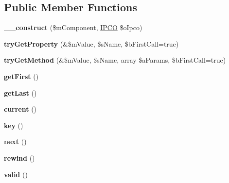 \subsection*{Public Member Functions}
\begin{DoxyCompactItemize}
\item 
\hypertarget{class_i_p_c_o___object_component_wrapper_a79d34f90ba8ddbee71a86182798eb7b3}{{\bfseries \-\_\-\-\_\-construct} (\$m\-Component, \hyperlink{class_i_p_c_o}{I\-P\-C\-O} \$o\-Ipco)}\label{class_i_p_c_o___object_component_wrapper_a79d34f90ba8ddbee71a86182798eb7b3}

\item 
\hypertarget{class_i_p_c_o___object_component_wrapper_aec8fb2d41cca130ebd1faa4b94f58161}{{\bfseries try\-Get\-Property} (\&\$m\-Value, \$s\-Name, \$b\-First\-Call=true)}\label{class_i_p_c_o___object_component_wrapper_aec8fb2d41cca130ebd1faa4b94f58161}

\item 
\hypertarget{class_i_p_c_o___object_component_wrapper_ac0f68f8c8d35708893e29e3dcc7237a8}{{\bfseries try\-Get\-Method} (\&\$m\-Value, \$s\-Name, array \$a\-Params, \$b\-First\-Call=true)}\label{class_i_p_c_o___object_component_wrapper_ac0f68f8c8d35708893e29e3dcc7237a8}

\item 
\hypertarget{class_i_p_c_o___object_component_wrapper_aec136d1927033eefcfecb52959cfdd87}{{\bfseries get\-First} ()}\label{class_i_p_c_o___object_component_wrapper_aec136d1927033eefcfecb52959cfdd87}

\item 
\hypertarget{class_i_p_c_o___object_component_wrapper_a18d9899c2468bc319c41fe286e05964e}{{\bfseries get\-Last} ()}\label{class_i_p_c_o___object_component_wrapper_a18d9899c2468bc319c41fe286e05964e}

\item 
\hypertarget{class_i_p_c_o___object_component_wrapper_ac6477130856c030b4234bb9e3575c496}{{\bfseries current} ()}\label{class_i_p_c_o___object_component_wrapper_ac6477130856c030b4234bb9e3575c496}

\item 
\hypertarget{class_i_p_c_o___object_component_wrapper_a4bbd26d99b4c1b937a7b1c7961a7de19}{{\bfseries key} ()}\label{class_i_p_c_o___object_component_wrapper_a4bbd26d99b4c1b937a7b1c7961a7de19}

\item 
\hypertarget{class_i_p_c_o___object_component_wrapper_a4533c66554514118bccdfc0646588eab}{{\bfseries next} ()}\label{class_i_p_c_o___object_component_wrapper_a4533c66554514118bccdfc0646588eab}

\item 
\hypertarget{class_i_p_c_o___object_component_wrapper_a10ac49651adaa4844523dd9c10b0c09b}{{\bfseries rewind} ()}\label{class_i_p_c_o___object_component_wrapper_a10ac49651adaa4844523dd9c10b0c09b}

\item 
\hypertarget{class_i_p_c_o___object_component_wrapper_adc9b59921b816c1e5783c18e2a688afb}{{\bfseries valid} ()}\label{class_i_p_c_o___object_component_wrapper_adc9b59921b816c1e5783c18e2a688afb}

\end{DoxyCompactItemize}
